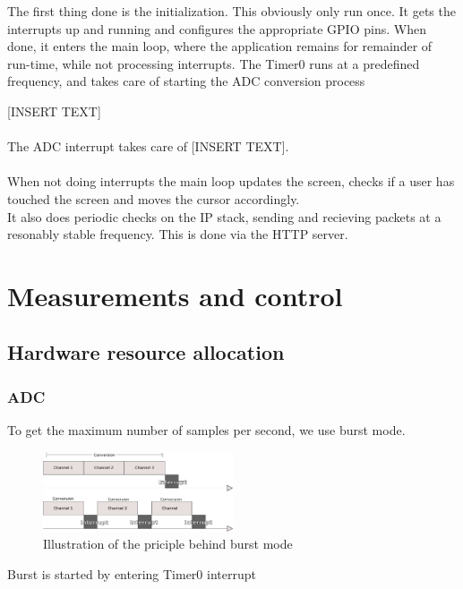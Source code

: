 The first thing done is the initialization. This obviously only run once. It gets the interrupts up and running and configures the appropriate GPIO pins. When done, it enters the main loop, where the application remains for remainder of run-time, while not processing interrupts. The Timer0 runs at a predefined frequency, and takes care of starting the ADC conversion process

[INSERT TEXT]\\\\

The ADC interrupt takes care of [INSERT TEXT].\\\\
When not doing interrupts the main loop updates the screen, checks if a user has touched the screen and moves the cursor accordingly.\\
It also does periodic checks on the IP stack, sending and recieving packets at a resonably stable frequency. This is done via the HTTP server.
\section{Measurements and control}
\subsection{Hardware resource allocation}
\subsubsection{ADC}
To get the maximum number of samples per second, we use burst mode. \\

\begin{figure}[!h]
  \centering
  \label{fig:burst_mode}
  \includegraphics[width=0.5\textwidth]{figs/burst_mode.pdf}
  \caption{Illustration of the priciple behind burst mode}
\end{figure}

Burst is started by entering Timer0 interrupt





